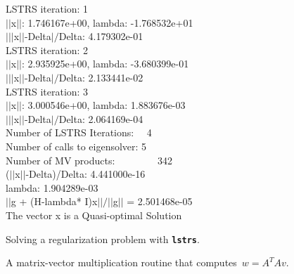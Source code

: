 \documentclass[acmtoms]{acmtrans2m}
\newcommand{\trans}{^{\scriptscriptstyle T}}
\newcommand{\noeq}{A\trans{A}}
\begin{document}
\begin{figure}[h!tbp]
\begin{center}
{{{LSTRS iteration: 1\\
$||$x$||$: 1.746167e+00, lambda: -1.768532e+01\\
$|||$x$||$-Delta$|/$Delta: 4.179302e-01\\[-0.2cm]

LSTRS iteration: 2\\
$||$x$||$: 2.935925e+00, lambda: -3.680399e-01\\
$|||$x$||$-Delta$|/$Delta: 2.133441e-02\\[-0.2cm]

LSTRS iteration: 3\\
$||$x$||$: 3.000546e+00, lambda: 1.883676e-03\\
$|||$x$||$-Delta$|/$Delta: 2.064169e-04\\[-0.2cm]

Number of LSTRS Iterations:     \ \ 4\\
Number of calls to eigensolver: \hspace{0.05cm}5\\
Number of MV products:         \ \ \ \ \ \ \ \ 342\\[-0.2cm]

($||$x$||$-Delta)/Delta: 4.441000e-16\\[-0.2cm]

lambda: 1.904289e-03\\[-0.2cm]

$||$g + (H-lambda* I)x$||/||$g$||$ = 2.501468e-05\\[-0.2cm]

The vector x is a Quasi-optimal Solution
}
}}
\caption{Solving a regularization problem with {\tt\bf lstrs}.}\label{regex}
\end{center}
\end{figure}

\begin{figure}[h!t]
\begin{center}
\caption{\small A matrix-vector multiplication routine that computes\ $w=\noeq v$.}\label{atamv}
\end{center}
\end{figure}
\end{document}
